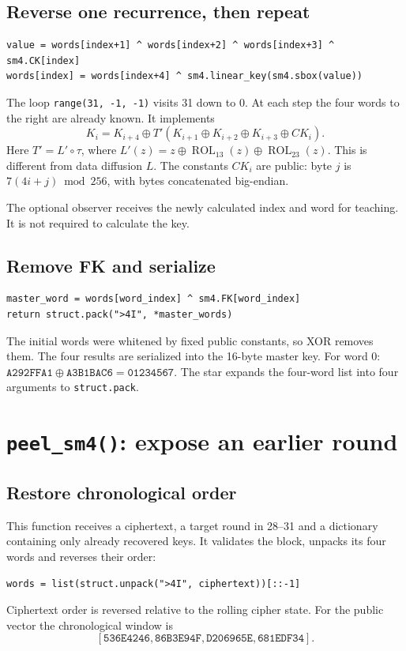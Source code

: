 \documentclass[11pt,a4paper]{article}
\newcommand{\hx}[1]{\texttt{#1}}
\newcommand{\hex}[1]{\texttt{#1}}
\newcommand{\xor}{\mathbin{\oplus}}
\newcommand{\rol}{\operatorname{ROL}}
\begin{document}
\subsection{Reverse one recurrence, then repeat}
\begin{Verbatim}
value = words[index+1] ^ words[index+2] ^ words[index+3] ^ sm4.CK[index]
words[index] = words[index+4] ^ sm4.linear_key(sm4.sbox(value))
\end{Verbatim}
The loop \hx{range(31, -1, -1)} visits 31 down to 0. At each step the four
words to the right are already known. It implements
\[
K_i=K_{i+4}\xor T'(K_{i+1}\xor K_{i+2}\xor K_{i+3}\xor CK_i).
\]
Here $T'=L'\circ\tau$, where $L'(z)=z\xor\rol_{13}(z)\xor\rol_{23}(z)$.
This is different from data diffusion $L$. The constants $CK_i$ are public:
byte $j$ is $7(4i+j)\bmod256$, with bytes concatenated big-endian.

The optional observer receives the newly calculated index and word for teaching.
It is not required to calculate the key.

\subsection{Remove FK and serialize}
\begin{Verbatim}
master_word = words[word_index] ^ sm4.FK[word_index]
return struct.pack(">4I", *master_words)
\end{Verbatim}
The initial words were whitened by fixed public constants, so XOR removes them.
The four results are serialized into the 16-byte master key. For word 0:
$\hex{A292FFA1}\xor\hex{A3B1BAC6}=\hex{01234567}$.
The star expands the four-word list into four arguments to \hx{struct.pack}.

\section{\texorpdfstring{\texttt{peel\_sm4()}}{peel_sm4}: expose an earlier round}
\subsection{Restore chronological order}
This function receives a ciphertext, a target round in 28--31 and a dictionary
containing only already recovered keys. It validates the block, unpacks its
four words and reverses their order:
\begin{Verbatim}
words = list(struct.unpack(">4I", ciphertext))[::-1]
\end{Verbatim}
Ciphertext order is reversed relative to the rolling cipher state. For the
public vector the chronological window is
\[
[\hex{536E4246},\hex{86B3E94F},\hex{D206965E},\hex{681EDF34}].
\]
\end{document}
